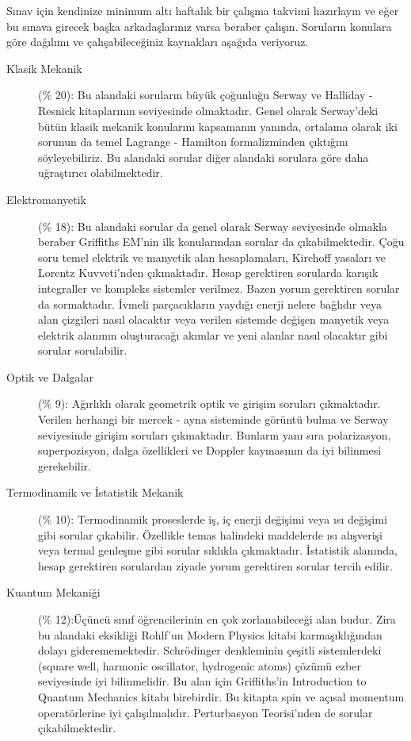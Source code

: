 \documentclass[12pt]{article}
\begin{document}
Sınav için kendinize minimum altı haftalık bir çalışma takvimi hazırlayın ve eğer bu sınava girecek başka arkadaşlarınız varsa beraber çalışın. Soruların konulara göre dağılımı ve çalışabileceğiniz kaynakları aşağıda veriyoruz.
\begin{description}
\item[Klasik Mekanik] (\% 20): Bu alandaki soruların büyük çoğunluğu Serway ve Halliday - Resnick kitaplarının seviyesinde olmaktadır. Genel olarak Serway’deki bütün klasik mekanik konularını kapsamanın yanında, ortalama olarak iki sorunun da temel Lagrange - Hamilton formalizminden çıktığını söyleyebiliriz. Bu alandaki sorular diğer alandaki sorulara göre daha uğraştırıcı olabilmektedir. 
\item[Elektromanyetik] (\% 18): Bu alandaki sorular da genel olarak Serway seviyesinde olmakla beraber Griffiths EM’nin ilk konularından sorular da çıkabilmektedir. Çoğu soru temel elektrik ve manyetik alan hesaplamaları, Kirchoff yasaları ve Lorentz Kuvveti’nden çıkmaktadır. Hesap gerektiren sorularda karışık integraller ve kompleks sistemler verilmez. Bazen yorum gerektiren sorular da sormaktadır. İvmeli parçacıkların yaydığı enerji nelere bağlıdır veya alan çizgileri nasıl olacaktır veya verilen sistemde değişen manyetik veya elektrik alanının oluşturacağı akımlar ve yeni alanlar nasıl olacaktır gibi sorular sorulabilir. 
\item[Optik ve Dalgalar] (\% 9): Ağırlıklı olarak geometrik optik ve girişim soruları çıkmaktadır. Verilen herhangi bir mercek - ayna sisteminde görüntü bulma ve Serway seviyesinde girişim soruları çıkmaktadır. Bunların yanı sıra polarizasyon,  superpozisyon, dalga özellikleri ve Doppler kaymasının da iyi bilinmesi gerekebilir.
\item[Termodinamik ve İstatistik Mekanik] (\% 10): Termodinamik proseslerde iş, iç enerji değişimi veya ısı değişimi gibi sorular çıkabilir. Özellikle temas halindeki maddelerde ısı alışverişi veya termal genleşme gibi sorular sıklıkla çıkmaktadır. İstatistik alanında, hesap gerektiren sorulardan ziyade yorum gerektiren sorular tercih edilir.  
\item[Kuantum Mekaniği] (\% 12):Üçüncü sınıf öğrencilerinin en çok zorlanabileceği alan budur. Zira bu alandaki eksikliği Rohlf’un Modern Physics kitabi karmaşıklığından dolayı giderememektedir. Schrödinger denkleminin çeşitli sistemlerdeki (square well, harmonic oscillator, hydrogenic atoms) çözümü ezber seviyesinde iyi bilinmelidir. Bu alan için Griffiths’in Introduction to Quantum Mechanics kitabı birebirdir. Bu kitapta spin ve açısal momentum operatörlerine iyi çalışılmalıdır. Perturbasyon Teorisi’nden de sorular çıkabilmektedir.  

\end{description}
\end{document}
